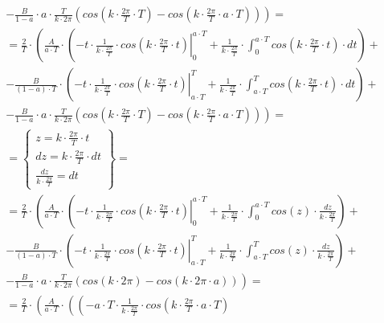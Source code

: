 \begin{task}
\begin{align*}
&-\left. \frac{B}{1-a}\cdot a \cdot \frac{T}{k \cdot 2\pi} \left( cos\left(k \cdot \frac{2\pi}{T} \cdot T\right) - cos\left(k \cdot \frac{2\pi}{T} \cdot a \cdot T\right) \right)\right)=\\
&=\frac{2}{T}\cdot\left( \frac{A}{a \cdot T} \cdot \left( \left. - t \cdot \frac{1}{k \cdot \frac{2\pi}{T}} \cdot cos\left( k \cdot \frac{2\pi}{T} \cdot t\right)
\right|_{0}^{a\cdot T} + \frac{1}{k \cdot \frac{2\pi}{T}} \cdot \int_{0}^{a\cdot T} cos\left( k \cdot \frac{2\pi}{T} \cdot t\right) \cdot dt\right) \right. + \\
&-\left.\frac{B}{\left(1-a\right)\cdot T}\cdot \left( \left.- t \cdot \frac{1}{k \cdot \frac{2\pi}{T}} \cdot cos\left( k \cdot \frac{2\pi}{T} \cdot t\right) \right|_{a \cdot T}^{T} + \frac{1}{k \cdot \frac{2\pi}{T}} \cdot \int_{a \cdot T}^{T} cos\left( k \cdot \frac{2\pi}{T} \cdot t\right) \cdot dt \right)\right. +\\
&-\left. \frac{B}{1-a}\cdot a \cdot \frac{T}{k \cdot 2\pi} \left( cos\left(k \cdot \frac{2\pi}{T} \cdot T\right) - cos\left(k \cdot \frac{2\pi}{T} \cdot a \cdot T\right) \right)\right)=\\
%
&=\left\{\begin{array}{l}
z = k \cdot \frac{2\pi}{T} \cdot t \\
dz = k \cdot \frac{2\pi}{T} \cdot dt \\
\frac{dz}{k \cdot \frac{2\pi}{T}} = dt
\end{array}\right\}=\\
&=\frac{2}{T}\cdot\left( \frac{A}{a \cdot T} \cdot \left( \left. -t \cdot \frac{1}{k \cdot \frac{2\pi}{T}} \cdot cos\left( k \cdot \frac{2\pi}{T} \cdot t\right)
\right|_{0}^{a\cdot T} + \frac{1}{k \cdot \frac{2\pi}{T}} \cdot \int_{0}^{a\cdot T} cos\left(z\right) \cdot \frac{dz}{k \cdot \frac{2\pi}{T}}\right) \right. + \\
&-\left.\frac{B}{\left(1-a\right)\cdot T}\cdot \left( \left. -t \cdot \frac{1}{k \cdot \frac{2\pi}{T}} \cdot cos\left( k \cdot \frac{2\pi}{T} \cdot t\right) \right|_{a \cdot T}^{T} + \frac{1}{k \cdot \frac{2\pi}{T}} \cdot \int_{a \cdot T}^{T}  cos\left( z\right) \cdot \frac{dz}{k \cdot \frac{2\pi}{T}} \right)\right. +\\
&-\left. \frac{B}{1-a}\cdot a \cdot \frac{T}{k \cdot 2\pi} \left( cos\left(k \cdot 2\pi\right) - cos\left(k \cdot 2\pi \cdot a\right) \right)\right)=\\
&=\frac{2}{T}\cdot\left( \frac{A}{a \cdot T} \cdot \left( \left( - a\cdot T \cdot \frac{1}{k \cdot \frac{2\pi}{T}} \cdot cos\left( k \cdot \frac{2\pi}{T} \cdot a\cdot T\right)

\end{align*}
\end{task}
